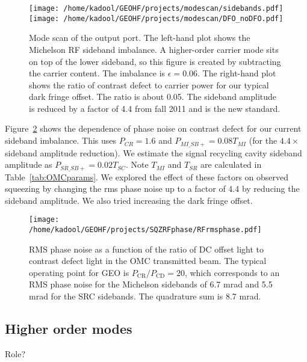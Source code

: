 \documentclass{ligodoc}
\begin{document}
\begin{figure}
\begin{centering}
\texttt{[image: /home/kadool/GEOHF/projects/modescan/sidebands.pdf]}\texttt{[image: /home/kadool/GEOHF/projects/modescan/DFO\_noDFO.pdf]}
\caption{Mode scan of the output port. The left-hand plot shows the
  Michelson RF sideband imbalance. A higher-order carrier mode sits on
  top of the lower sideband, so this figure is created by subtracting
  the carrier content. The imbalance is $\epsilon = 0.06$. The
  right-hand plot shows the ratio of contrast defect to carrier power
  for our typical dark fringe offset. The ratio is about 0.05. The
  sideband amplitude is reduced by a factor of 4.4 from fall 2011 and
  is the new standard.}
\label{fig:modescan}
\end{centering}
\end{figure}

Figure~\ref{fig:phirms} shows the dependence of phase noise on
contrast defect for our current sideband imbalance. This uses
$P_{CR}=1.6$ and $P_{MI\_SB+}=0.08 T_{MI}$ (for the $4.4\times$
sideband amplitude reduction). We estimate the signal recycling cavity
sideband amplitude as $P_{SR\_SB+}=0.02 T_{SC}$. Note $T_{MI}$ and
$T_{SR}$ are calculated in Table~\ref{tab:OMCparams}. We explored the
effect of these factors on observed squeezing by changing the rms
phase noise up to a factor of 4.4 by reducing the sideband
amplitude. We also tried increasing the dark fringe offset. 


\begin{figure}
\begin{centering}
\texttt{[image: /home/kadool/GEOHF/projects/SQZRFphase/RFrmsphase.pdf]}
\caption{RMS phase noise as a function of the ratio of DC offset light
  to contrast defect light in the OMC transmitted beam. The typical
  operating point for GEO is $P_{\mathrm{CR}}/P_{\mathrm{CD}}=20$,
  which corresponds to an RMS phase noise for the Michelson sidebands
  of 6.7 mrad and 5.5 mrad for the SRC sidebands. The quadrature sum
  is 8.7 mrad.}
\label{fig:phirms}
\end{centering}
\end{figure}



\subsection{Higher order modes}
Role?
\end{document}
